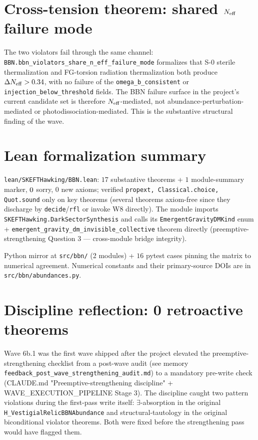 \documentclass[twocolumn]{revtex4-2}
\newcommand{\dNeff}{\Delta N_{\rm eff}}
\begin{document}
\section{Cross-tension theorem: shared $N_{\rm eff}$ failure mode}
\label{sec:cross}

The two violators fail through the same channel:
\texttt{BBN.bbn\_violators\_share\_n\_eff\_failure\_mode} formalizes
that S-0 sterile thermalization and FG-torsion radiation thermalization
both produce $\dNeff > 0.34$, with no failure of the
\texttt{omega\_b\_consistent} or \texttt{injection\_below\_threshold}
fields. The BBN failure surface in the project's current candidate
set is therefore $N_{\rm eff}$-mediated, not abundance-perturbation-
mediated or photodissociation-mediated. This is the substantive
structural finding of the wave.

\section{Lean formalization summary}
\label{sec:lean}

\texttt{lean/SKEFTHawking/BBN.lean}: $17$ substantive theorems +
$1$ module-summary marker, $0{}$ sorry, $0$ new axioms;
verified \texttt{propext, Classical.choice, Quot.sound} only on key
theorems (several theorems axiom-free since they discharge by
\texttt{decide}/\texttt{rfl} or invoke W8 directly). The module
imports \texttt{SKEFTHawking.DarkSectorSynthesis} and calls its
\texttt{EmergentGravityDMKind} enum + \texttt{emergent\_gravity\_dm\_invisible\_collective}
theorem directly (preemptive-strengthening Question 3 — cross-module
bridge integrity).

Python mirror at \texttt{src/bbn/} (2 modules) + $16$ pytest cases
pinning the matrix to numerical agreement. Numerical constants and
their primary-source DOIs are in
\texttt{src/bbn/abundances.py}.

\section{Discipline reflection: 0 retroactive theorems}

Wave 6b.1 was the first wave shipped after the project elevated the
preemptive-strengthening checklist from a post-wave audit (see
memory \texttt{feedback\_post\_wave\_strengthening\_audit.md}) to a
mandatory pre-write check (CLAUDE.md "Preemptive-strengthening
discipline" + WAVE\_EXECUTION\_PIPELINE Stage 3). The discipline
caught two pattern violations during the first-pass write itself:
$\exists$-absorption in the original \texttt{H\_VestigialRelicBBNAbundance}
and structural-tautology in the original biconditional violator
theorems. Both were fixed before the strengthening pass would have
flagged them.
\end{document}
